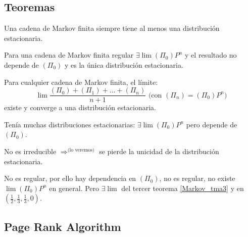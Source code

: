 \subsection{Teoremas}
\begin{theorem}[Teorema 1]
	\label{Markov_tma1}
	Una cadena de Markov finita siempre tiene al menos una distribución estacionaria.
\end{theorem}

\begin{theorem}[Teorema 2]
	\label{Markov_tma2}
	Para una cadena de Markov finita regular $\exists \lim (\Pi_0) P^n$ y el resultado no depende de $(\Pi_0)$ y es la única distribución estacionaria.
\end{theorem}

\begin{theorem}[Teorema 3]
	\label{Markov_tma3}
	Para cualquier cadena de Markov finita, el límite:
	\[\lim \frac{(\Pi_0)+(\Pi_1)+…+(\Pi_n)}{n+1}  \text{ (con }(\Pi_n) = (\Pi_0)P^n\text{)}\]
	existe y converge a una distribución estacionaria.
\end{theorem}


\begin{example}

\begin{center}
\end{center}

Tenía muchas distribuciones estacionarias: $\exists \lim(\Pi_0)P^n$ pero depende de $(\Pi_0)$.

No es irreducible $\Rightarrow^{\text{(lo veremos)}}$ se pierde la unicidad de la distribución estacionaria.

\end{example}

\begin{example}

\begin{center}
\end{center}

No es regular, por ello hay dependencia en $(\Pi_0)$, no es regular, no existe $\lim(\Pi_0) P^n$ en general. Pero $\exists \lim$ del tercer teorema \ref{Markov_tma3} y en $\left(\frac{1}{2},\frac{1}{3},\frac{1}{3},0\right)$.

\end{example}


\subsection{Page Rank Algorithm}

